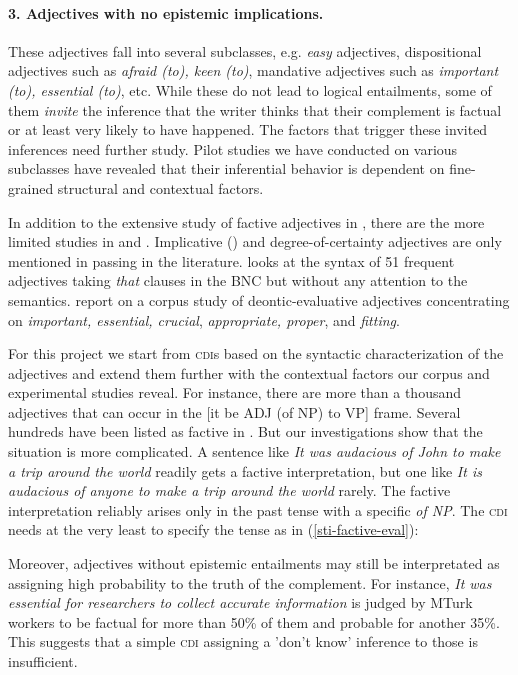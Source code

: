 \documentclass[10pt]{article}
\begin{document}
\vspace{-.2in}
\paragraph{3. Adjectives with no epistemic implications.}
These adjectives fall into several subclasses, e.g. \textit{easy} adjectives, dispositional adjectives such as \textit{afraid (to), keen (to)}, mandative adjectives such as \textit{important (to), essential (to)}, etc. While these do not lead to logical entailments, some of them \textit{invite} the inference that the writer thinks that their complement is factual or at least very likely to have happened. The factors that trigger these invited inferences need further study. Pilot studies we have conducted on various subclasses have revealed  that their inferential behavior is dependent on fine-grained structural and contextual factors.

In addition to the extensive study of factive adjectives in \cite{norrick:1978},
there are the more limited studies in \cite{wilkinson:1970} and \cite{barker:2002}. Implicative (\cite{karttunen:1971}) and degree-of-certainty adjectives are only mentioned in passing in the literature. \cite{mindt:2011} looks at the syntax of 51 frequent adjectives taking \emph{that }clauses in the BNC but without any attention to the semantics. \cite{vanlinden+davidse:2009} report on a corpus study of deontic-evaluative adjectives concentrating on \emph{important, essential, crucial}, \emph{appropriate, proper}, and \emph{fitting}.
 
For this project we start from \textsc{cdi}s based on the syntactic characterization of the adjectives and extend them further with the contextual factors our corpus and experimental studies reveal. For instance, there are more than a thousand adjectives that can occur in the [it be ADJ (of NP) to VP] frame. Several hundreds have been listed as factive in \cite{norrick:1978}. But our investigations show that the situation is more complicated. A sentence like \textit{It was audacious of John to make a trip around the world} readily gets a factive interpretation, but one like \textit{It is audacious of anyone to make a trip around the world} rarely. The factive interpretation reliably arises only in the past tense with a specific \textit{of NP}. The \textsc{cdi} needs at the very least to specify the tense as in (\ref{sti-factive-eval}):

\vspace{-0.6em}
\vspace{-0.6em}
Moreover, adjectives without epistemic entailments may still be interpretated as assigning high probability to the truth of the complement. For instance, \textit{It was essential for researchers to collect accurate information} is judged by MTurk workers to be factual for more than 50\% of them and probable for another 35\%. This suggests that a simple \textsc{cdi} assigning a 'don't know' inference to those is insufficient. 
\end{document}
